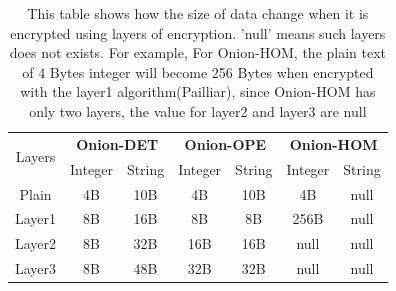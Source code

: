 \begin{table}
\renewcommand{\arraystretch}{1.3}

\begin{tabular}{c|c c|c c|c c}
\toprule
\multirow{2}{0.8cm}{Layers} & \multicolumn{2}{c}{\textbf{Onion-DET}} & \multicolumn{2}{c}{\textbf{Onion-OPE}} & \multicolumn{2}{c}{\textbf{Onion-HOM}}\\
\cmidrule{2-7}
& Integer & String & Integer & String & Integer & String\\
\midrule
Plain & 4B & 10B & 4B & 10B & 4B & null \\
Layer1 & 8B & 16B & 8B & 8B & 256B & null \\
Layer2 & 8B & 32B & 16B & 16B & null & null \\
Layer3 & 8B & 48B & 32B & 32B & null & null \\
\bottomrule
\end{tabular}
\caption{This table shows how the size of data change when it is encrypted using layers of encryption. 'null' means such layers does not exists. For example, For Onion-HOM, the plain text of 4 Bytes integer will become 256 Bytes when encrypted with the layer1 algorithm(Pailliar), since Onion-HOM has only two layers, the value for layer2 and layer3 are null}
\label{tab:exampless}
\end{table}













